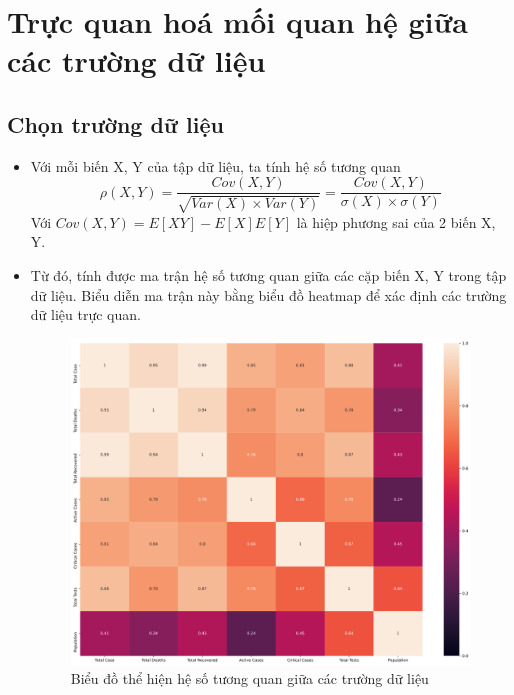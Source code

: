 \documentclass[a4paper, 12pt]{article}
\begin{document}
    \clearpage 

    \section{Trực quan hoá mối quan hệ giữa các trường dữ liệu}

    \subsection{Chọn trường dữ liệu}

    \begin{itemize}
        \item Với mỗi biến X, Y của tập dữ liệu, ta tính hệ số tương quan 
        \begin{equation}
            \rho(X, Y) = \frac{Cov(X, Y)}{\sqrt{Var(X)\times Var(Y)}} = \frac{Cov(X, Y)}{\sigma(X)\times \sigma(Y)}
        \end{equation}
        Với $Cov(X,Y) = E[XY] - E[X]E[Y]$ là hiệp phương sai của 2 biến X, Y.

        \item Từ đó, tính được ma trận hệ số tương quan giữa các cặp biến X, Y trong tập dữ liệu. Biểu diễn ma trận này bằng biểu đồ heatmap để xác định các trường dữ liệu trực quan.
        \begin{figure}[H]
            \begin{center}
                \includegraphics[scale = 0.3]{img/heatmap.png}
                \caption{Biểu đồ thể hiện hệ số tương quan giữa các trường dữ liệu}
            \end{center}
        \end{figure}


\end{itemize}
\end{document}
